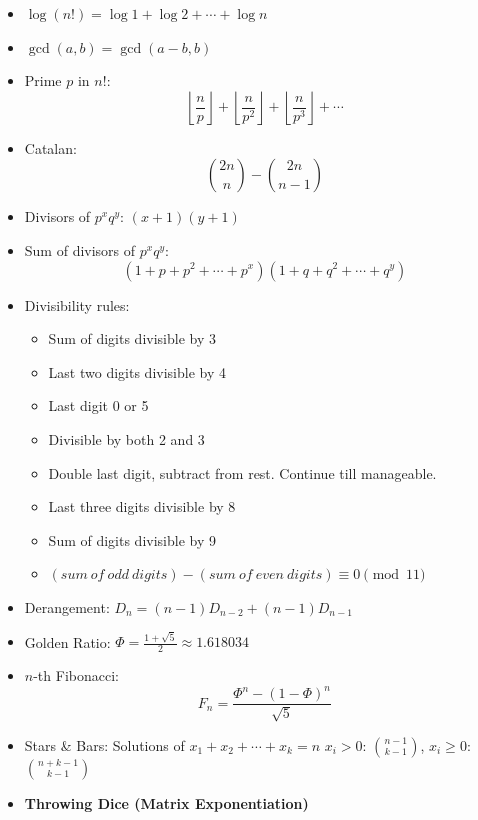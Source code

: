 \begin{itemize}
    \item $\log(n!) = \log 1 + \log 2 + \cdots + \log n$
    \item $\gcd(a, b) = \gcd(a-b, b)$
    \item Prime $p$ in $n!$: $$\left\lfloor \frac{n}{p} \right\rfloor + \left\lfloor
              \frac{n}{p^2} \right\rfloor + \left\lfloor \frac{n}{p^3} \right\rfloor +
              \cdots$$
    \item Catalan: $$\binom{2n}{n} - \binom{2n}{n-1}$$
    \item Divisors of $p^xq^y$: $(x+1)(y+1)$
    \item Sum of divisors of $p^xq^y$: $$(1 + p + p^2 + \cdots + p^x)(1 + q + q^2 +
              \cdots + q^y)$$
    \item Divisibility rules:
          \begin{itemize}
              \item[\textbf{3}:] Sum of digits divisible by 3
              \item[\textbf{4}:] Last two digits divisible by 4
              \item[\textbf{5}:] Last digit 0 or 5
              \item[\textbf{6}:] Divisible by both 2 and 3
              \item[\textbf{7}:] Double last digit, subtract from rest. Continue till manageable.
              \item[\textbf{8}:] Last three digits divisible by 8
              \item[\textbf{9}:] Sum of digits divisible by 9
              \item[\textbf{11}:] $(sum\ of\ odd\ digits) - (sum\ of\ even\ digits) \equiv 0 \pmod{11}$
          \end{itemize}
    \item Derangement: $D_n = (n-1)D_{n-2} + (n-1)D_{n-1}$
    \item Golden Ratio: $\Phi = \frac{1 + \sqrt{5}}{2} \approx 1.618034$
    \item $n$-th Fibonacci: $$F_n = \frac{\Phi^n - (1-\Phi)^n}{\sqrt{5}}$$
    \item Stars \& Bars: Solutions of $x_1+x_2+\cdots+x_k=n$ $x_i > 0$:
          $\binom{n-1}{k-1}$, $x_i \geq 0$: $\binom{n+k-1}{k-1}$

    \item \textbf{Throwing Dice (Matrix Exponentiation)}


\end{itemize}
